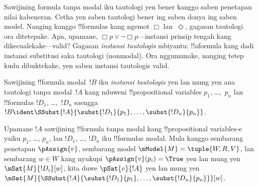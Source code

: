 \documentclass[../../../include/open-logic-section]{subfiles}
\begin{document}


\begin{explain}
Sawijining formula tanpa modal iku tautologi yen bener kanggo saben
penetapan nilai kabeneran. Cetha yen saben tautologi bener ing saben
donya ing saben model. Nanging kanggo !!{formula}s kang ngemot $\Box$
lan~$\Diamond$, gagasan tautologi ora ditetepake. Apa, upamane,
$\Box p \lor \lnot \Box p$---instansi prinsip tengah kang
dikecualekake---valid? Gagasan \emph{instansi tautologis} mbiyantu:
!!a{formula} kang dadi instansi substitusi saka tautologi (nonmodal).
Ora nggumunake, nanging tetep kudu dibuktekake, yen saben instansi
tautologis valid.
\end{explain}

\begin{defn}
  Sawijining !!{formula} modal~$!B$ iku \emph{instansi tautologis} yen
  lan mung yen ana tautologi tanpa modal~$!A$ kang nduweni !!{propositional
    variable}s $p_1$, \dots,~$p_n$ lan !!{formula}s $!D_1$,
  \dots,~$!D_n$ saengga $!B \ident \SSubst{!A}{\subst{!D_1}{p_1},
    \dots, \subst{!D_n}{p_n}}$.
\end{defn}

\begin{lem}
  Upamane $!A$ sawijining !!{formula} tanpa modal kang !!{propositional
  variable}s-e yaiku $p_1$, \dots, $p_n$, lan $!D_1$, \dots,
  $!D_n$ iku !!{formula}s modal. Mula kanggo sembarang penetapan $\pAssign{v}$,
  sembarang model $\mModel{M} = \tuple{W, R, V}$, lan sembarang $w \in W$
  kang nyukupi $\pAssign{v}(p_i) = \True$ yen lan mung yen $\mSat{M}{!D_i}[w]$,
  kita duwe $\pSat{v}{!A}$ yen lan mung yen
  $\mSat{M}{\SSubst{!A}{\subst{!D_1}{p_1}, \dots,
      \subst{!D_n}{p_n}}}[w]$.
\end{lem}
\end{document}
